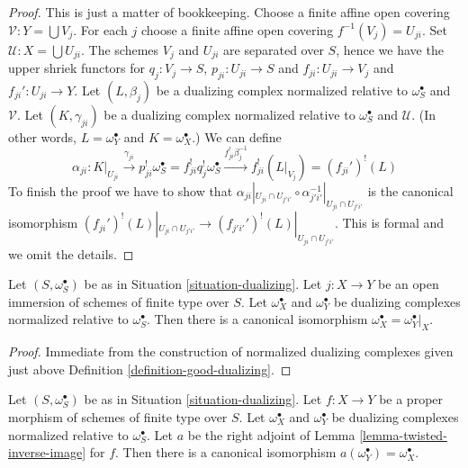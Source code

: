 \begin{proof}
This is just a matter of bookkeeping.
Choose a finite affine open covering $\mathcal{V} : Y = \bigcup V_j$.
For each $j$ choose a finite affine open covering $f^{-1}(V_j) = U_{ji}$.
Set $\mathcal{U} : X = \bigcup U_{ji}$. The schemes $V_j$ and $U_{ji}$ are
separated over $S$, hence we have the upper shriek functors for
$q_j : V_j \to S$, $p_{ji} : U_{ji} \to S$ and
$f_{ji} : U_{ji} \to V_j$ and $f_{ji}' : U_{ji} \to Y$.
Let $(L, \beta_j)$ be a dualizing complex normalized relative to
$\omega_S^\bullet$ and $\mathcal{V}$.
Let $(K, \gamma_{ji})$ be a dualizing complex normalized relative to
$\omega_S^\bullet$ and $\mathcal{U}$.
(In other words, $L = \omega_Y^\bullet$ and $K = \omega_X^\bullet$.)
We can define
$$
\alpha_{ji} :
K|_{U_{ji}} \xrightarrow{\gamma_{ji}}
p_{ji}^!\omega_S^\bullet = f_{ji}^!q_j^!\omega_S^\bullet
\xrightarrow{f_{ji}^!\beta_j^{-1}} f_{ji}^!(L|_{V_j}) =
(f_{ji}')^!(L)
$$
To finish the proof we have to show that
$\alpha_{ji}|_{U_{ji} \cap U_{j'i'}}
\circ \alpha_{j'i'}^{-1}|_{U_{ji} \cap U_{j'i'}}$
is the canonical isomorphism
$(f_{ji}')^!(L)|_{U_{ji} \cap U_{j'i'}} \to
(f_{j'i'}')^!(L)|_{U_{ji} \cap U_{j'i'}}$. This is formal and we
omit the details.
\end{proof}

\begin{lemma}
\label{lemma-open-immersion-good-dualizing-complex}
Let $(S, \omega_S^\bullet)$ be as in Situation \ref{situation-dualizing}.
Let $j : X \to Y$ be an open immersion of schemes of finite type over $S$.
Let $\omega_X^\bullet$ and $\omega_Y^\bullet$ be dualizing complexes
normalized relative to $\omega_S^\bullet$. Then there is a canonical
isomorphism $\omega_X^\bullet = \omega_Y^\bullet|_X$.
\end{lemma}

\begin{proof}
Immediate from the construction of normalized dualizing complexes
given just above
Definition \ref{definition-good-dualizing}.
\end{proof}

\begin{lemma}
\label{lemma-proper-map-good-dualizing-complex}
Let $(S, \omega_S^\bullet)$ be as in Situation \ref{situation-dualizing}.
Let $f : X \to Y$ be a proper morphism of schemes of finite type over $S$.
Let $\omega_X^\bullet$ and $\omega_Y^\bullet$ be dualizing complexes
normalized relative to $\omega_S^\bullet$. Let $a$ be the
right adjoint of Lemma \ref{lemma-twisted-inverse-image} for
$f$. Then there is a canonical isomorphism
$a(\omega_Y^\bullet) = \omega_X^\bullet$.
\end{lemma}

